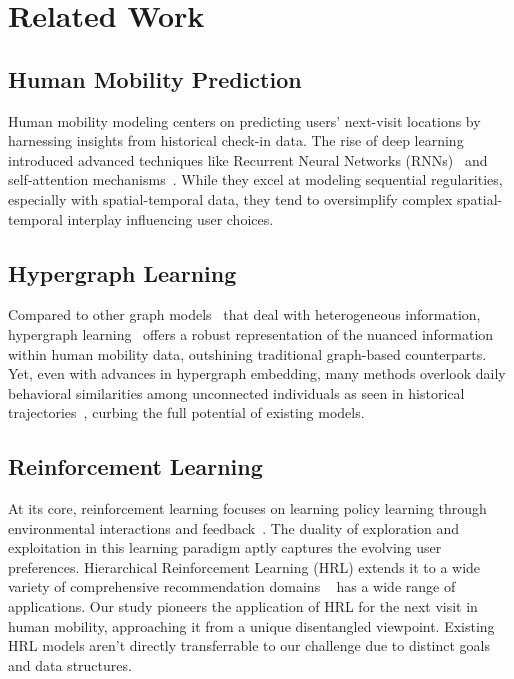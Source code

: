 \documentclass[letterpaper]{article} %
\begin{document}
\section{Related Work}
\subsection{Human Mobility Prediction}
Human mobility modeling centers on predicting users' next-visit locations by harnessing insights from historical check-in data. The rise of deep learning introduced advanced techniques like Recurrent Neural Networks (RNNs)~\cite{liu2016predicting,yang2020location} and self-attention mechanisms~\cite{lian2020geography,DBLP:conf/www/LuoLL21}. While they excel at modeling sequential regularities, especially with spatial-temporal data, they tend to oversimplify complex spatial-temporal interplay influencing user choices.

\subsection{Hypergraph Learning}
Compared to other graph models~\cite{dong2023temporal,DBLP:conf/aaai/00070WWY23,dong2023adaptive} that deal with heterogeneous information,
hypergraph learning~\cite{yang2019revisiting,liu2022hypergraph,yan2023spatio} offers a robust representation of the nuanced information within human mobility data, outshining traditional graph-based counterparts. Yet, even with advances in hypergraph embedding, many methods overlook daily behavioral similarities among unconnected individuals as seen in historical trajectories~\cite{yang2022getnext}, curbing the full potential of existing models.

\subsection{Reinforcement Learning}
At its core, reinforcement learning focuses on learning policy learning through environmental interactions and feedback~\cite{mnih2015human,jiang2023reinforced}. The duality of exploration and exploitation in this learning paradigm aptly captures the evolving user preferences. Hierarchical Reinforcement Learning (HRL) extends it to a wide variety of comprehensive recommendation domains ~\cite{zhang2019hierarchical,
yu2020expanrl,
xie2021hierarchical,
du2022denoising,
DBLP:journals/tmc/WangDYJMSZQW22} has a wide range of applications. Our study pioneers the application of HRL for the next visit in human mobility, approaching it from a unique disentangled viewpoint. Existing HRL models aren't directly transferrable to our challenge due to distinct goals and data structures.
\end{document}
